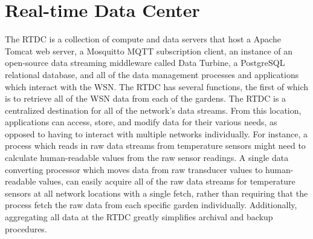 
\section{Real-time Data Center}
The RTDC is a collection of compute and data servers that host a Apache Tomcat web server, a Mosquitto MQTT subscription client, an instance of an open-source data streaming middleware called Data Turbine, a PostgreSQL relational database, and all of the data management processes and applications which interact with the WSN. The RTDC has several functions, the first of which is to retrieve all of the WSN data from each of the gardens. The RTDC is a centralized destination for all of the network's data streams. From this location, applications can access, store, and modify data for their various needs, as opposed to having to interact with multiple networks individually. For instance, a process which reads in raw data streams from temperature sensors might need to calculate human-readable values from the raw sensor readings. A single data converting processor which moves data from raw transducer values to human-readable values, can easily acquire all of the raw data streams for temperature sensors at all network locations with a single fetch, rather than requiring that the process fetch the raw data from each specific garden individually. Additionally, aggregating all data at the RTDC greatly simplifies archival and backup procedures.\\

